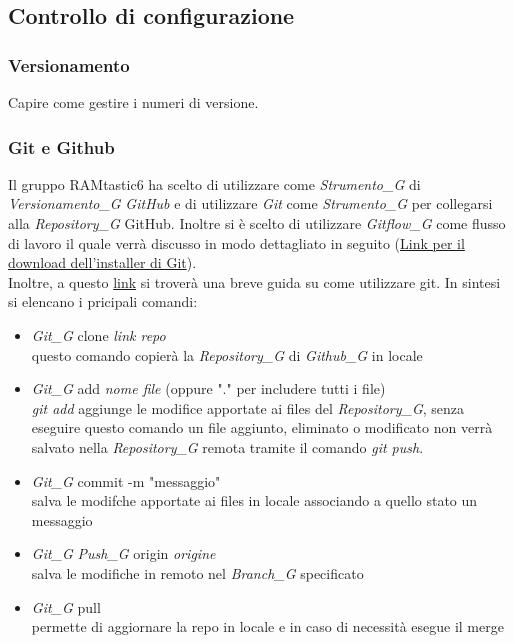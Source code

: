 \documentclass[12pt, oneside]{article}
\begin{document}
\subsection{Controllo di configurazione}
\subsubsection{Versionamento}
Capire come gestire i numeri di versione.
\subsubsection{Git e Github}
Il gruppo RAMtastic6 ha scelto di utilizzare come \textit{Strumento_G} di \textit{Versionamento_G} \emph{GitHub} e di utilizzare \emph{Git} come \textit{Strumento_G} per collegarsi alla \textit{Repository_G} GitHub.
Inoltre si è scelto di utilizzare \textit{Gitflow_G} come flusso di lavoro il quale verrà discusso in modo dettagliato in seguito
(\href{https://git-scm.com/downloads}{Link per il download dell'installer di Git}).\\
Inoltre, a questo \href{https://rogerdudler.github.io/git-guide/index.it.html}{link} si troverà una breve guida su come utilizzare git.
In sintesi si elencano i pricipali comandi:
\begin{itemize}
    \item \textit{Git_G} clone \emph{link repo}\\
    questo comando copierà la \textit{Repository_G} di \textit{Github_G} in locale
    \item \textit{Git_G} add \emph{nome file} (oppure "." per includere tutti i file)\\
    \emph{git add} aggiunge le modifice apportate ai files del \textit{Repository_G}, senza eseguire questo comando un file aggiunto, eliminato o modificato non verrà salvato nella \textit{Repository_G} remota tramite il comando \emph{git push}.
    \item \textit{Git_G} commit -m "messaggio" \\
    salva le modifche apportate ai files in locale associando a quello stato un messaggio
    \item \textit{Git_G} \textit{Push_G} origin \emph{origine} \\
    salva le modifiche in remoto nel \textit{Branch_G} specificato
    \item \textit{Git_G} pull \\
    permette di aggiornare la repo in locale e in caso di necessità esegue il merge
\end{itemize}
\end{document}

